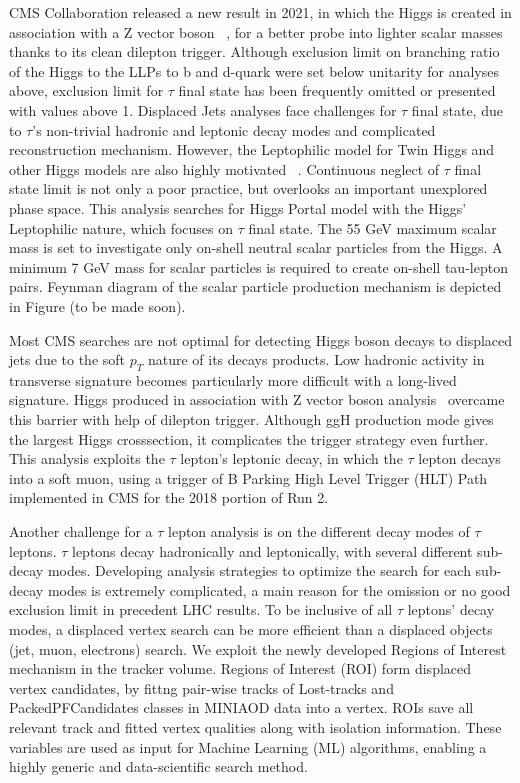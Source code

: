 CMS Collaboration released a new result in 2021, in which the Higgs is created in association with a Z vector boson ~\cite{ZHAN}, for a better probe into lighter scalar masses thanks to its clean dilepton trigger.
Although exclusion limit on branching ratio of the Higgs to the LLPs to b and d-quark were set below unitarity for analyses above, exclusion limit for $\tau$ final state has been frequently omitted or presented with values above 1.  
Displaced Jets analyses face challenges for $\tau$ final state, due to $\tau$'s non-trivial hadronic and leptonic decay modes and complicated reconstruction mechanism. 
However, the Leptophilic model for Twin Higgs and other Higgs models are also highly motivated ~\cite{Lepto}. Continuous neglect of $\tau$ final state limit is not only a poor practice, but overlooks an important unexplored phase space. 
This analysis searches for Higgs Portal model with the Higgs' Leptophilic nature, which focuses on $\tau$ final state.
The 55 GeV maximum scalar mass is set to investigate only on-shell neutral scalar particles from the Higgs. 
A minimum 7 GeV mass for scalar particles is required to create on-shell tau-lepton pairs.
Feynman diagram of the scalar particle production mechanism is depicted in Figure (to be made soon).

Most CMS searches are not optimal for detecting Higgs boson decays to displaced jets
due to the soft $p_T$ nature of its decays products.
Low hadronic activity in transverse signature becomes particularly more difficult with a long-lived signature.
Higgs produced in association with Z vector boson analysis~\cite{ZHAN} overcame this barrier with help of dilepton trigger. 
Although ggH production mode gives the largest Higgs crosssection, it complicates the trigger strategy even further. 
This analysis exploits the $\tau$ lepton's leptonic decay, in which the $\tau$ lepton decays into a soft muon, using a trigger of B Parking High Level Trigger (HLT) Path implemented in CMS for the 2018 portion of Run 2.

Another challenge for a $\tau$ lepton analysis is on the different decay modes of $\tau$ leptons. 
$\tau$ leptons decay hadronically and leptonically, with several different sub-decay modes. 
Developing analysis strategies to optimize the search for each sub-decay modes is extremely complicated, a main reason for the omission or no good exclusion limit in precedent LHC results.
To be inclusive of all $\tau$ leptons' decay modes, a displaced vertex search can be more efficient than a displaced objects (jet, muon, electrons) search. 
We exploit the newly developed Regions of Interest mechanism in the tracker volume. 
Regions of Interest (ROI) form displaced vertex candidates, by fittng pair-wise tracks of Lost-tracks and PackedPFCandidates classes in MINIAOD data into a vertex. 
ROIs save all relevant track and fitted vertex qualities along with isolation information.
These variables are used as input for Machine Learning (ML) algorithms, enabling a highly generic and data-scientific search method.


